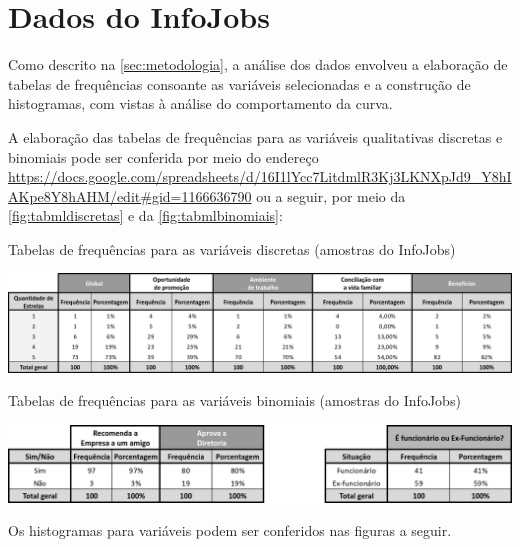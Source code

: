 	\section{Dados do InfoJobs}
	
	Como descrito na \autoref{sec:metodologia}, a análise dos dados envolveu a elaboração de tabelas de frequências consoante as variáveis selecionadas e a construção de histogramas, com vistas à análise do comportamento da curva.
		
	A elaboração das tabelas de frequências para as variáveis qualitativas discretas e binomiais pode ser conferida por meio do endereço \url{https://docs.google.com/spreadsheets/d/16I1lYcc7LitdmlR3Kj3LKNXpJd9_Y8hIAKpe8Y8hAHM/edit#gid=1166636790} ou a seguir, por meio da \autoref{fig:tabmldiscretas} e da \autoref{fig:tabmlbinomiais}:
	
	\begin{table}
		\centering
		\caption{Tabelas de frequências para as variáveis discretas (amostras do InfoJobs)}
		\label{fig:tabmldiscretas}
		\includegraphics[width=1\linewidth]{img/tab_ml_discretas}
	\end{table}
	
	\begin{table}
		\centering
		\caption{Tabelas de frequências para as variáveis binomiais (amostras do InfoJobs)}
		\label{fig:tabmlbinomiais}
		\includegraphics[width=1\linewidth]{img/tab_ml_binomiais}
	\end{table}

	Os histogramas para variáveis podem ser conferidos nas figuras a seguir.
	
